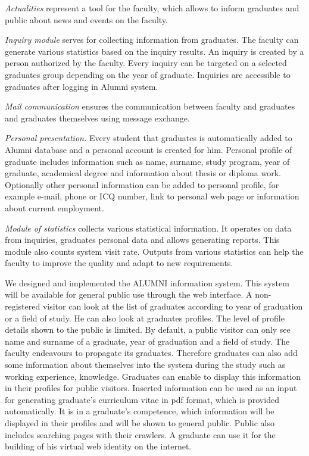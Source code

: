 \documentclass{iitsrc}
\begin{document}
{\em Actualities} 
represent a tool for the faculty, which allows to inform graduates and public about news and events on the faculty.

{\em Inquiry module}
serves for collecting information from graduates. The faculty can generate various statistics based on the inquiry results. An inquiry is created by a person authorized by the faculty. Every inquiry can be targeted on a selected graduates group depending on the year of graduate. Inquiries are accessible to graduates after logging in Alumni system.

{\em Mail communication} ensures the communication between faculty and graduates and graduates themselves using message exchange.

{\em Personal presentation.}
Every student that graduates is automatically added to Alumni database and a personal account is created for him. Personal profile of graduate includes information such as name, surname, study program, year of graduate, academical degree and information about thesis or diploma work. Optionally other personal information can be added to personal profile, for example e-mail, phone or ICQ number, link to personal web page or information about current employment. 

{\em Module of statistics}
collects various statistical information. It operates on data from inquiries, graduates personal data and allows generating reports. This module also counts system visit rate. Outputs from various statistics can help the faculty to improve the quality and adapt to new requirements.

We designed and implemented the ALUMNI information system. This system will be available for general public use through the web interface. A non-registered visitor can look at the list of graduates according to year of graduation or a field of study. He can also look at graduates profiles. The level of profile details shown to the public is limited. By default, a public visitor can only see name and surname of a graduate, year of graduation and a field of study. The faculty endeavours to propagate its graduates. Therefore graduates can also add some information about themselves into the system during the study such as working experience, knowledge. Graduates can enable to display this information in their profiles for public visitors. Inserted information can be used as an input for generating graduate's curriculum vitae in pdf format, which is provided automatically. It is in a graduate's competence, which information will be displayed in their profiles and will be shown to general public. Public also includes searching pages with their crawlers. A graduate can use it for the building of his virtual web identity on the internet. 


\nocite{team14}
\nocite{team15}
\nocite{cakephp}



\end{document}
